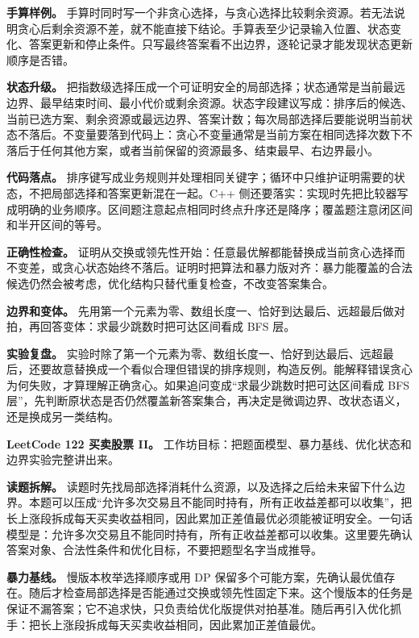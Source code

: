 \textbf{手算样例。} 手算时同时写一个非贪心选择，与贪心选择比较剩余资源。若无法说明贪心后剩余资源不差，就不能直接下结论。手算表至少记录输入位置、状态变化、答案更新和停止条件。只写最终答案看不出边界，逐轮记录才能发现状态更新顺序是否错。

\textbf{状态升级。} 把指数级选择压成一个可证明安全的局部选择；状态通常是当前最远边界、最早结束时间、最小代价或剩余资源。状态字段建议写成：排序后的候选、当前已选方案、剩余资源或最远边界、答案计数；每次局部选择后要能说明当前状态不落后。不变量要落到代码上：贪心不变量通常是当前方案在相同选择次数下不落后于任何其他方案，或者当前保留的资源最多、结束最早、右边界最小。

\textbf{代码落点。} 排序键写成业务规则并处理相同关键字；循环中只维护证明需要的状态，不把局部选择和答案更新混在一起。C++ 侧还要落实：实现时先把比较器写成明确的业务顺序。区间题注意起点相同时终点升序还是降序；覆盖题注意闭区间和半开区间的等号。

\textbf{正确性检查。} 证明从交换或领先性开始：任意最优解都能替换成当前贪心选择而不变差，或贪心状态始终不落后。证明时把算法和暴力版对齐：暴力能覆盖的合法候选仍然会被考虑，优化结构只替代重复检查，不改变答案集合。

\textbf{边界和变体。} 先用第一个元素为零、数组长度一、恰好到达最后、远超最后做对拍，再回答变体：求最少跳数时把可达区间看成 BFS 层。

\textbf{实验复盘。} 实验时除了第一个元素为零、数组长度一、恰好到达最后、远超最后，还要故意替换成一个看似合理但错误的排序规则，构造反例。能解释错误贪心为何失败，才算理解正确贪心。如果追问变成“求最少跳数时把可达区间看成 BFS 层”，先判断原状态是否仍然覆盖新答案集合，再决定是微调边界、改状态语义，还是换成另一类结构。

\noindent\textbf{LeetCode 122 买卖股票 II。} 工作坊目标：把题面模型、暴力基线、优化状态和边界实验完整讲出来。

\textbf{读题拆解。} 读题时先找局部选择消耗什么资源，以及选择之后给未来留下什么边界。本题可以压成“允许多次交易且不能同时持有，所有正收益差都可以收集”，把长上涨段拆成每天买卖收益相同，因此累加正差值最优必须能被证明安全。一句话模型是：允许多次交易且不能同时持有，所有正收益差都可以收集。这里要先确认答案对象、合法性条件和优化目标，不要把题型名字当成推导。

\textbf{暴力基线。} 慢版本枚举选择顺序或用 DP 保留多个可能方案，先确认最优值存在。随后才检查局部选择是否能通过交换或领先性固定下来。这个慢版本的任务是保证不漏答案；它不追求快，只负责给优化版提供对拍基准。随后再引入优化抓手：把长上涨段拆成每天买卖收益相同，因此累加正差值最优。

